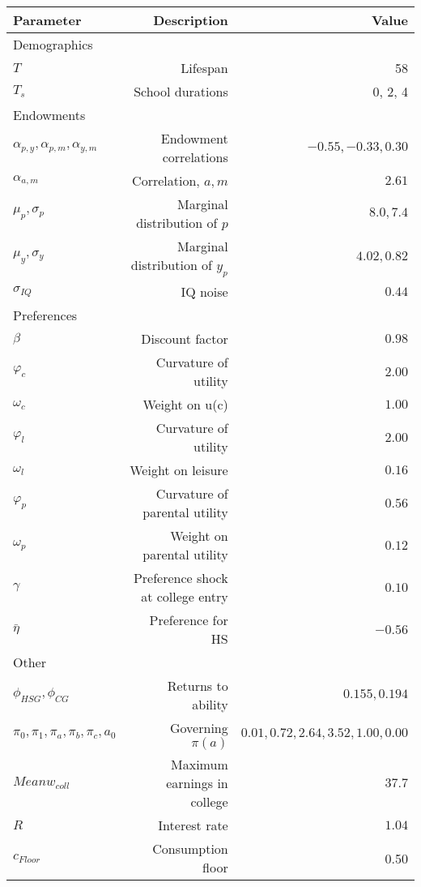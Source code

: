 \begin{tabular}{lrr}
\hline
Parameter & Description  & Value  \\
\hline
Demographics &   &   \\
$T$ & Lifespan  & 58  \\
$T_{s}$ & School durations  & 0, 2, 4  \\
Endowments &   &   \\
$\alpha_{p,y}, \alpha_{p,m}, \alpha_{y,m}$ & Endowment correlations  & $-0.55, -0.33, 0.30$  \\
$\alpha_{a,m}$ & Correlation, $a,m$  & $2.61$  \\
$\mu_{p}, \sigma_{p}$ & Marginal distribution of $p$  & $8.0, 7.4$  \\
$\mu_{y}, \sigma_{y}$ & Marginal distribution of $y_{p}$  & $4.02, 0.82$  \\
$\sigma_{IQ}$ & IQ noise  & $0.44$  \\
Preferences &   &   \\
$\beta$ & Discount factor  & $0.98$  \\
$\varphi_{c}$ & Curvature of utility  & $2.00$  \\
$\omega_{c}$ & Weight on u(c)  & $1.00$  \\
$\varphi_{l}$ & Curvature of utility  & $2.00$  \\
$\omega_{l}$ & Weight on leisure  & $0.16$  \\
$\varphi_{p}$ & Curvature of parental utility  & $0.56$  \\
$\omega_{p}$ & Weight on parental utility  & $0.12$  \\
$\gamma$ & Preference shock at college entry  & $0.10$  \\
$\bar{\eta}$ & Preference for HS  & $-0.56$  \\
Other &   &   \\
$\phi_{HSG}, \phi_{CG}$ & Returns to ability  & $0.155, 0.194$  \\
$\pi_{0}, \pi_{1}, \pi_{a}, \pi_{b}, \pi_{c}, a_{0}$ & Governing $\pi(a)$  & $0.01, 0.72, 2.64, 3.52, 1.00, 0.00$  \\
$Mean w_{coll}$ & Maximum earnings in college  & $37.7$  \\
$R$ & Interest rate  & $1.04$  \\
$c_{Floor}$ & Consumption floor  & 0.50  \\
\hline
\end{tabular}%
